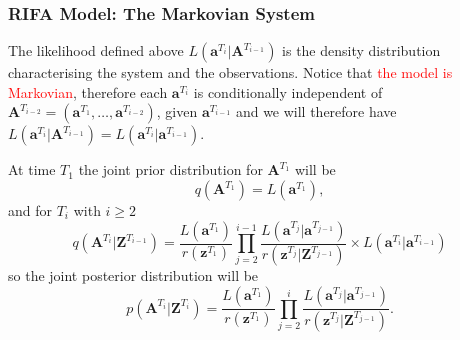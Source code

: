 \documentclass[9pt, xcolor={dvipsnames,svgnames,table}]{beamer}
\begin{document}
\begin{frame}
    \frametitle{RIFA Model: The Markovian System}
    \textcolor{PineGreen}{The likelihood defined above $L(\bm{a}^{T_i} | \bm{A}^{T_{i-1}})$ is the density distribution characterising the system and the observations}. Notice that \textcolor{Red}{the model is Markovian}, therefore each $\bm{a}^{T_i}$ is conditionally independent of $\bm{A}^{T_{i-2}} = (\bm{a}^{T_1}, \dots, \bm{a}^{T_{i-2}})$, given $\bm{a}^{T_{i-1}}$ and we will therefore have $L(\bm{a}^{T_i} | \bm{A}^{T_{i-1}}) = L(\bm{a}^{T_i} | \bm{a}^{T_{i-1}})$.
    
    At time $T_1$ the joint prior distribution for $\bm{A}^{T_1}$ will be
    \begin{equation*}
        q(\bm{A}^{T_1}) = L(\bm{a}^{T_1}),
    \end{equation*}
    and for $T_i$ with $i \geq 2$
    \begin{equation*}
        q(\bm{A}^{T_i} | \bm{Z}^{T_{i-1}}) =  \frac{L(\bm{a}^{T_1})}{r(\bm{z}^{T_1})} \prod_{j=2}^{i-1} \frac{L(\bm{a}^{T_j} | \bm{a}^{T_{j-1}})}{r(\bm{z}^{T_j} | \bm{Z}^{T_{j-1}})} \times L(\bm{a}^{T_i} | \bm{a}^{T_{i-1}})
    \end{equation*}
    so \textcolor{PineGreen}{the joint posterior distribution} will be
    \begin{equation*}
        p(\bm{A}^{T_i} | \bm{Z}^{T_i}) = \frac{L(\bm{a}^{T_1})}{r(\bm{z}^{T_1})} \prod_{j=2}^{i} \frac{L(\bm{a}^{T_j} | \bm{a}^{T_{j-1}})}{r(\bm{z}^{T_j} | \bm{Z}^{T_{j-1}})}.
    \end{equation*}
\end{frame}
\end{document}
